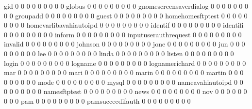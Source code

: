 \documentclass[compress,8pt]{beamer}
\begin{document}
\begin{frame}
\begin{Schunk}
  gid                                        0   0   0   0   0   0   0   0   0
  globus                                     0   0   0   0   0   0   0   0   0
  gnomescreensaverdialog                     0   0   0   0   0   0   0   0   0
  groupadd                                   0   0   0   0   0   0   0   0   0
  guest                                      0   0   0   0   0   0   0   0   0
  homehomesftptest                           0   0   0   0   0   0   0   0   0
  homevarlibavahiautoipd                     0   0   0   0   0   0   0   0   0
  identif                                    0   0   0   0   0   0   0   0   0
  identifi                                   0   0   0   0   0   0   0   0   0
  inform                                     0   0   0   0   0   0   0   0   0
  inputuserauthrequest                       0   0   0   0   0   0   0   0   0
  invalid                                    0   0   0   0   0   0   0   0   0
  johnson                                    0   0   0   0   0   0   0   0   0
  jone                                       0   0   0   0   0   0   0   0   0
  jun                                        0   0   0   0   0   0   0   0   0
  lee                                        0   0   0   0   0   0   0   0   0
  linda                                      0   0   0   0   0   0   0   0   0
  listen                                     0   0   0   0   0   0   0   0   0
  login                                      0   0   0   0   0   0   0   0   0
  logname                                    0   0   0   0   0   0   0   0   0
  lognamerichard                             0   0   0   0   0   0   0   0   0
  mar                                        0   0   0   0   0   0   0   0   0
  mari                                       0   0   0   0   0   0   0   0   0
  marin                                      0   0   0   0   0   0   0   0   0
  martin                                     0   0   0   0   0   0   0   0   0
  mode                                       0   0   0   0   0   0   0   0   0
  mysql                                      0   0   0   0   0   0   0   0   0
  nameavahiautoipd                           0   0   0   0   0   0   0   0   0
  namesftptest                               0   0   0   0   0   0   0   0   0
  news                                       0   0   0   0   0   0   0   0   0
  nov                                        0   0   0   0   0   0   0   0   0
  pam                                        0   0   0   0   0   0   0   0   0
  pamsucceedifauth                           0   0   0   0   0   0   0   0   0

\end{Schunk}
\end{frame}
\end{document}
